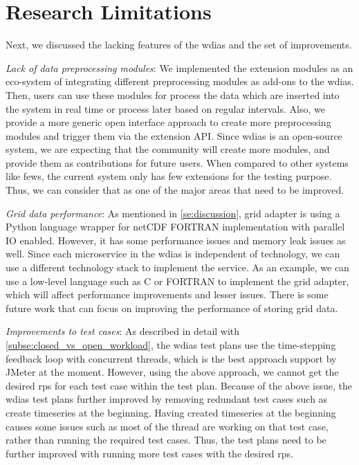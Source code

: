 \section{Research Limitations}
\label{se:research_limitations}

Next, we discussed the lacking features of the \acrshort{wdias} and the set of improvements.

\emph{Lack of data preprocessing modules}:
We implemented the extension modules as an eco-system of integrating different preprocessing modules as add-ons to the \acrshort{wdias}. Then, users can use these modules for process the data which are inserted into the system in real time or process later based on regular intervals. Also, we provide a more generic open interface approach to create more preprocessing modules and trigger them via the extension API. Since \acrshort{wdias} is an open-source system, we are expecting that the community will create more modules, and provide them as contributions for future users. When compared to other systems like \acrshort{fews}, the current system only has few extensions for the testing purpose. Thus, we can consider that as one of the major areas that need to be improved.

\emph{Grid data performance}:
As mentioned in \cref{se:discussion}, grid adapter is using a Python language wrapper for netCDF FORTRAN implementation with parallel IO enabled. However, it has some performance issues and memory leak issues as well. Since each microservice in the \acrshort{wdias} is independent of technology, we can use a different technology stack to implement the service. As an example, we can use a low-level language such as C or FORTRAN to implement the grid adapter, which will affect performance improvements and lesser issues. There is some future work that can focus on improving the performance of storing grid data.

\emph{Improvements to test cases}:
As described in detail with \cref{subse:closed_vs_open_workload}, the \acrshort{wdias} test plans use the time-stepping feedback loop with concurrent threads, which is the best approach support by JMeter at the moment. However, using the above approach, we cannot get the desired \acrshort{rps} for each test case within the test plan.
Because of the above issue, the \acrshort{wdias} test plans further improved by removing redundant test cases such as create timeseries at the beginning. Having created timeseries at the beginning causes some issues such as most of the thread are working on that test case, rather than running the required test cases. Thus, the test plans need to be further improved with running more test cases with the desired \acrshort{rps}.

